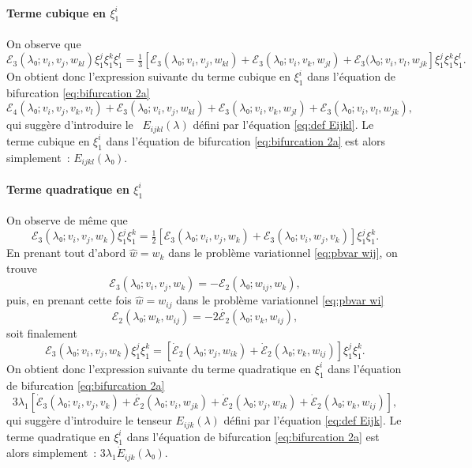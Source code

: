 \documentclass{article}
\begin{document}
\paragraph{Terme cubique en $ξ_1^i$}On observe que
\begin{equation} ℰ_3 (λ₀ ; v_i, v_j, w_{k  l}) ξ_1^j ξ_1^k
   ξ_1^l = \text{} \tfrac{1}{3}  [ℰ_3 (λ₀ ; v_i, v_j, w_{k
    l})  +ℰ_3 (λ₀ ; v_i, v_k, w_{j
   l}) +ℰ_3 (λ₀ ; v_i, v_l, w_{j  k}] ξ_1^j ξ_1^k
   ξ_1^l . \end{equation}
On obtient donc l'expression suivante du terme cubique en $ξ_1^i$ dans
l'équation de bifurcation \eqref{eq:bifurcation 2a}
\begin{equation} ℰ_4 (λ₀ ; v_i, v_j, v_k, v_l) +ℰ_3 (λ₀ ;
   v_i, v_j, w_{k  l}) +ℰ_3 (λ₀ ; v_i, v_k, w_{j
    l}) +ℰ_3 (λ₀ ; v_i, v_l, w_{j  k}), \end{equation}
qui suggère d'introduire le \ $E_{i  j  k  l}
(λ)$ défini par l'équation \eqref{eq:def Eijkl}. Le terme
cubique en $ξ_1^i$ dans l'équation de bifurcation \eqref{eq:bifurcation
2a} est alors simplement~: $E_{i  j  k  l}
(λ₀)$.

\paragraph{Terme quadratique en $ξ_1^i$}On observe de même que
\begin{equation} ℰ_3 (λ₀ ; v_i, v_j, w_k) ξ_1^j ξ_1^k = \tfrac{1}{2}
   [ℰ_3 (λ₀ ; v_i, v_j, w_k) +ℰ_3 (λ₀ ; v_i,
   w_j, v_k)] ξ_1^j ξ_1^k . \end{equation}
En prenant tout d'abord $\widehat{w} = w_k$ dans le problème variationnel
\eqref{eq:pbvar wij}, on trouve
\begin{equation} ℰ_3 (λ₀ ; v_i, v_j, w_k) = -ℰ_2 (λ₀ ;
   w_{i  j}, w_k), \end{equation}
puis, en prenant cette fois $\hat{w} = w_{i  j}$ dans le problème
variationnel \eqref{eq:pbvar wi}
\begin{equation} ℰ_2 (λ₀ ; w_k, w_{i  j}) = - 2 \dot{ℰ_2}
   (λ₀ ; v_k, w_{i  j}), \end{equation}
soit finalement
\begin{equation} ℰ_3 (λ₀ ; v_i, v_j, w_k) ξ_1^j ξ_1^k =
   [\dot{ℰ}_2 (λ₀ ; v_j, w_{i  k}) +
   \dot{ℰ}_2 (λ₀ ; v_k, w_{i  j})] ξ_1^j ξ_1^k .
\end{equation}
On obtient donc l'expression suivante du terme quadratique en $ξ_1^i$ dans
l'équation de bifurcation \eqref{eq:bifurcation 2a}
\begin{equation} 3 λ_1  [\dot{ℰ}_3 (λ₀ ; v_i, v_j, v_k) +
   \dot{ℰ_2} (λ₀ ; v_i, w_{j  k}) +
   \dot{ℰ}_2 (λ₀ ; v_j, w_{i  k}) +
   \dot{ℰ}_2 (λ₀ ; v_k, w_{i  j})], \end{equation}
qui suggère d'introduire le tenseur $E_{i  j  k}
(λ)$ défini par l'équation \eqref{eq:def Eijk}. Le terme
quadratique en $ξ_1^i$ dans l'équation de bifurcation
\eqref{eq:bifurcation 2a} est alors simplement~: $3 λ_1  \dot{E}_{i
 j  k} (λ₀)$.
\end{document}
